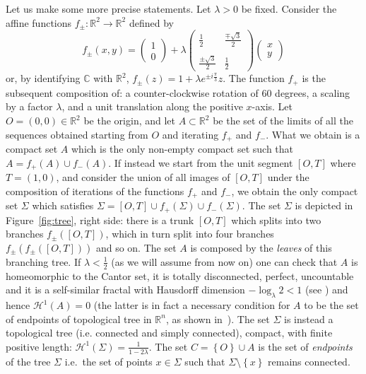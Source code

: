 \documentclass{amsart}
\newcommand{\RR}{\mathbb R}
\newcommand{\CC}{\mathbb C}
\renewcommand{\H}{\mathcal H}
\newcommand{\ENCLOSE}[1]{\left\{#1\right\}}
\renewcommand{\H}{\mathcal{H}}
\theoremstyle{definition}
\theoremstyle{remark}
\begin{document}
Let us make some more precise statements.
Let $\lambda>0$ be fixed.
Consider the affine functions $f_\pm\colon \RR^2\to \RR^2$ defined by
\[
  f_\pm(x,y) = \begin{pmatrix} 1 \\ 0 \end{pmatrix} 
    + \lambda \begin{pmatrix} 
        \frac 1 2 & \frac{\mp\sqrt 3}{2} \\\\ 
        \frac{\pm\sqrt 3}{2} & \frac 1 2 
      \end{pmatrix} \begin{pmatrix} x \\ y \end{pmatrix}
\]
or, by identifying $\CC$ with $\RR^2$,
$f_\pm(z) = 1 + \lambda e^{\pm i \frac \pi 3} z$.
The function $f_+$ is the subsequent composition of: a counter-clockwise rotation of $60$ degrees,
a scaling by a factor $\lambda$, and a unit translation along the positive $x$-axis.
Let $O=(0,0)\in \RR^2$ be the origin, and let $A\subset \RR^2$ be the set of 
the limits of all the sequences obtained starting from $O$ and 
iterating $f_+$ and $f_-$.
What we obtain is a compact set $A$ which is the only non-empty compact set 
such that $A=f_+(A)\cup f_-(A)$.
If instead we start from the unit segment $[O,T]$ where $T=(1,0)$, and 
consider the union of all images of $[O,T]$ under the composition of iterations of the 
functions $f_+$ and $f_-$, we obtain the only compact set $\Sigma$ which satisfies 
$\Sigma=[O,T]\cup f_+(\Sigma)\cup f_-(\Sigma)$.
The set $\Sigma$ is depicted in Figure~\ref{fig:tree}, right side:
there is a trunk $[O,T]$ which splits into two branches $f_\pm([O,T])$, 
which in turn split into four branches $f_\pm(f_\pm([O,T]))$ and so on.
The set $A$ is composed by the \emph{leaves} of this branching tree.
If $\lambda < \frac 1 2$ (as we will assume from now on)
one can check that $A$ is 
homeomorphic to the Cantor set, it is totally disconnected, 
perfect, uncountable and it is a self-similar fractal with Hausdorff dimension
$-\log_\lambda 2<1$ (see \cite{Hut81}) and hence $\H^1(A)=0$
(the latter is in fact a necessary condition for $A$ to be the set of endpoints of topological tree
in $\RR^n$, as shown in~\cite[proposition~3.3]{PaoSteTep15}).
The set $\Sigma$ is instead a topological tree (i.e.{} connected and simply connected), 
compact, with finite positive length: $\H^1(\Sigma) = \frac{1}{1-2\lambda}$.
The set $C=\ENCLOSE{O}\cup A$ is the set of \emph{endpoints} of the tree $\Sigma$ i.e.\ 
the set of points $x\in \Sigma$ such that $\Sigma\setminus\ENCLOSE{x}$ remains connected.
\end{document}
